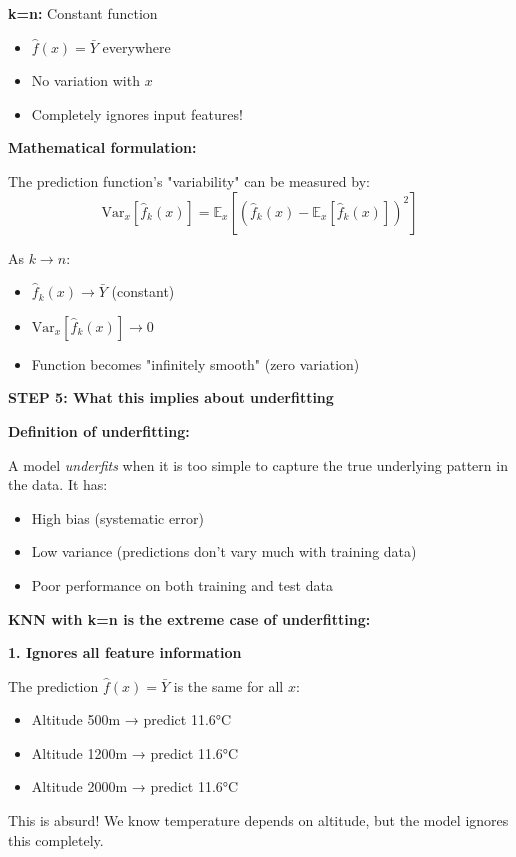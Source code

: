 \documentclass[12pt]{article}
\begin{document}
\begin{solution}
\textbf{k=n:} Constant function
\begin{itemize}
    \item \(\hat{f}(x) = \bar{Y}\) everywhere
    \item No variation with \(x\)
    \item Completely ignores input features!
\end{itemize}

\textbf{Mathematical formulation:}

The prediction function's "variability" can be measured by:
\[
\text{Var}_x[\hat{f}_k(x)] = \mathbb{E}_x[(\hat{f}_k(x) - \mathbb{E}_x[\hat{f}_k(x)])^2]
\]

As \(k \to n\):
\begin{itemize}
    \item \(\hat{f}_k(x) \to \bar{Y}\) (constant)
    \item \(\text{Var}_x[\hat{f}_k(x)] \to 0\)
    \item Function becomes "infinitely smooth" (zero variation)
\end{itemize}

\textbf{STEP 5: What this implies about underfitting}

\textbf{Definition of underfitting:}

A model \textit{underfits} when it is too simple to capture the true underlying pattern in the data. It has:
\begin{itemize}
    \item High bias (systematic error)
    \item Low variance (predictions don't vary much with training data)
    \item Poor performance on both training and test data
\end{itemize}

\textbf{KNN with k=n is the extreme case of underfitting:}

\textbf{1. Ignores all feature information}

The prediction \(\hat{f}(x) = \bar{Y}\) is the same for all \(x\):
\begin{itemize}
    \item Altitude 500m → predict 11.6°C
    \item Altitude 1200m → predict 11.6°C
    \item Altitude 2000m → predict 11.6°C
\end{itemize}

This is absurd! We know temperature depends on altitude, but the model ignores this completely.


\end{solution}
\end{document}
